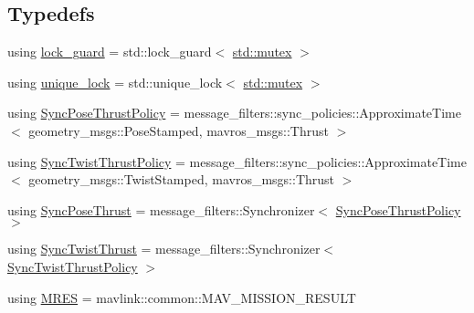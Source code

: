 \subsection*{Typedefs}
\begin{DoxyCompactItemize}
\item 
using \mbox{\hyperlink{group__plugin_gaf7a417aa5096c3eb3c0856187e77b766}{lock\+\_\+guard}} = std\+::lock\+\_\+guard$<$ \mbox{\hyperlink{data_8c_a4acff8232e4aec9cd5c6dc200ac55ef3}{std\+::mutex}} $>$
\item 
using \mbox{\hyperlink{group__plugin_ga9de76c8b4514d14b9b92bdbc83572808}{unique\+\_\+lock}} = std\+::unique\+\_\+lock$<$ \mbox{\hyperlink{data_8c_a4acff8232e4aec9cd5c6dc200ac55ef3}{std\+::mutex}} $>$
\item 
using \mbox{\hyperlink{group__plugin_ga48ed4062810bb42590cbed0b4e0dc237}{Sync\+Pose\+Thrust\+Policy}} = message\+\_\+filters\+::sync\+\_\+policies\+::\+Approximate\+Time$<$ geometry\+\_\+msgs\+::\+Pose\+Stamped, mavros\+\_\+msgs\+::\+Thrust $>$
\item 
using \mbox{\hyperlink{group__plugin_gacfaec844da30bf9462d4583c55fa64e1}{Sync\+Twist\+Thrust\+Policy}} = message\+\_\+filters\+::sync\+\_\+policies\+::\+Approximate\+Time$<$ geometry\+\_\+msgs\+::\+Twist\+Stamped, mavros\+\_\+msgs\+::\+Thrust $>$
\item 
using \mbox{\hyperlink{group__plugin_gab78f646d4cfccf2c656a3aeb2605cad1}{Sync\+Pose\+Thrust}} = message\+\_\+filters\+::\+Synchronizer$<$ \mbox{\hyperlink{group__plugin_ga48ed4062810bb42590cbed0b4e0dc237}{Sync\+Pose\+Thrust\+Policy}} $>$
\item 
using \mbox{\hyperlink{group__plugin_ga4a8954a9b71d632e038309fa85fe5bb2}{Sync\+Twist\+Thrust}} = message\+\_\+filters\+::\+Synchronizer$<$ \mbox{\hyperlink{group__plugin_gacfaec844da30bf9462d4583c55fa64e1}{Sync\+Twist\+Thrust\+Policy}} $>$
\item 
using \mbox{\hyperlink{group__plugin_ga70798af9f8bc5db9dd75d667d4488ae6}{M\+R\+ES}} = mavlink\+::common\+::\+M\+A\+V\+\_\+\+M\+I\+S\+S\+I\+O\+N\+\_\+\+R\+E\+S\+U\+LT
\end{DoxyCompactItemize}
